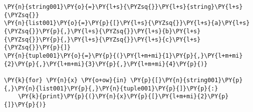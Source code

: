 \begin{Verbatim}[commandchars=\\\{\}]
\PY{n}{string001}\PY{o}{=}\PY{l+s}{\PYZsq{}}\PY{l+s}{string}\PY{l+s}{\PYZsq{}}
\PY{n}{list001}\PY{o}{=}\PY{p}{[}\PY{l+s}{\PYZsq{}}\PY{l+s}{a}\PY{l+s}{\PYZsq{}}\PY{p}{,}\PY{l+s}{\PYZsq{}}\PY{l+s}{b}\PY{l+s}{\PYZsq{}}\PY{p}{,}\PY{l+s}{\PYZsq{}}\PY{l+s}{c}\PY{l+s}{\PYZsq{}}\PY{p}{]}
\PY{n}{tuple001}\PY{o}{=}\PY{p}{(}\PY{l+m+mi}{1}\PY{p}{,}\PY{l+m+mi}{2}\PY{p}{,}\PY{l+m+mi}{3}\PY{p}{,}\PY{l+m+mi}{4}\PY{p}{)}

\PY{k}{for} \PY{n}{x} \PY{o+ow}{in} \PY{p}{[}\PY{n}{string001}\PY{p}{,}\PY{n}{list001}\PY{p}{,}\PY{n}{tuple001}\PY{p}{]}\PY{p}{:}
    \PY{k}{print}\PY{p}{(}\PY{n}{x}\PY{p}{[}\PY{l+m+mi}{2}\PY{p}{]}\PY{p}{)}
\end{Verbatim}
